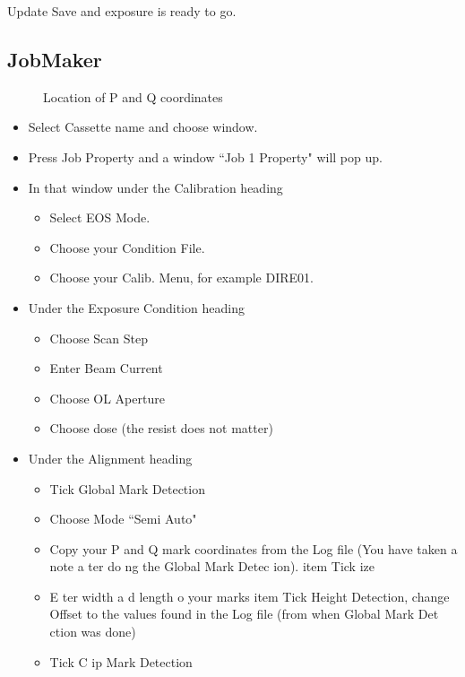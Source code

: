 \begin{framed}\noindent
  Update \ira Save and exposure is ready to go.
\end{framed}

\subsection{JobMaker}\label{sec:jobmaker}

\begin{figure}[h]
  \centering {}
  \caption{\small Location of P and Q coordinates}
\end{figure}

\begin{itemize}
\item Select Cassette name and choose window.
\item Press Job Property and a window ``Job 1 Property" will pop up.
\item In that window under the Calibration heading
  \begin{itemize}
  \item Select EOS Mode.
  \item Choose your Condition File.
  \item Choose your Calib. Menu, for example DIRE01. %
  \end{itemize}
\item Under the Exposure Condition heading
  \begin{itemize}
  \item Choose Scan Step
  \item Enter Beam Current
  \item Choose OL Aperture
  \item Choose dose (the resist does not matter)
  \end{itemize}
\item Under the Alignment heading
  \begin{itemize}
  \item Tick Global Mark Detection
  \item Choose Mode ``Semi Auto"
  \item Copy your P  and Q mark coordinates from the Log file  (You have taken a
    note a ter do ng the Global Mark Detec ion).  item Tick ize
  \item E ter width  a d length o your marks item  Tick Height Detection, change
    Offset to the values found in the  Log file (from when Global Mark Det ction
    was done)
  \item Tick C ip Mark Detection

\end{itemize}
\end{itemize}
